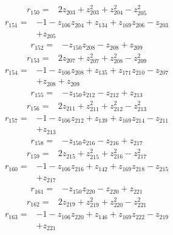 \begin{align*}
r_{150}={}&2z_{203} +z_{203}^{2} +z_{204}^{2} -z_{205}^{2}
\end{align*}
\begin{align*}
r_{151}={}&-1 -z_{106}z_{204} +z_{134} +z_{169}z_{206} -z_{203}\\
&+z_{205}
\end{align*}
\begin{align*}
r_{152}={}&-z_{150}z_{208} -z_{208} +z_{209}
\end{align*}
\begin{align*}
r_{153}={}&2z_{207} +z_{207}^{2} +z_{208}^{2} -z_{209}^{2}
\end{align*}
\begin{align*}
r_{154}={}&-1 -z_{106}z_{208} +z_{135} +z_{171}z_{210} -z_{207}\\
&+z_{208} +z_{209}
\end{align*}
\begin{align*}
r_{155}={}&-z_{150}z_{212} -z_{212} +z_{213}
\end{align*}
\begin{align*}
r_{156}={}&2z_{211} +z_{211}^{2} +z_{212}^{2} -z_{213}^{2}
\end{align*}
\begin{align*}
r_{157}={}&-1 -z_{106}z_{212} +z_{139} +z_{169}z_{214} -z_{211}\\
&+z_{213}
\end{align*}
\begin{align*}
r_{158}={}&-z_{150}z_{216} -z_{216} +z_{217}
\end{align*}
\begin{align*}
r_{159}={}&2z_{215} +z_{215}^{2} +z_{216}^{2} -z_{217}^{2}
\end{align*}
\begin{align*}
r_{160}={}&-1 -z_{106}z_{216} +z_{142} +z_{169}z_{218} -z_{215}\\
&+z_{217}
\end{align*}
\begin{align*}
r_{161}={}&-z_{150}z_{220} -z_{220} +z_{221}
\end{align*}
\begin{align*}
r_{162}={}&2z_{219} +z_{219}^{2} +z_{220}^{2} -z_{221}^{2}
\end{align*}
\begin{align*}
r_{163}={}&-1 -z_{106}z_{220} +z_{146} +z_{169}z_{222} -z_{219}\\
&+z_{221}
\end{align*}
